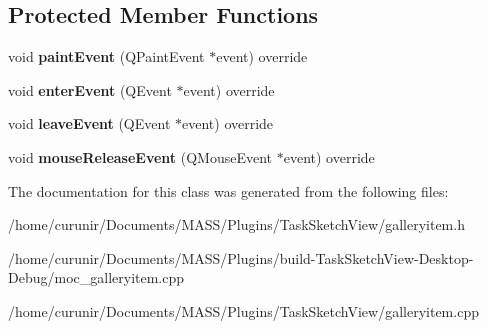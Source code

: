 \subsection*{Protected Member Functions}
\begin{DoxyCompactItemize}
\item 
void {\bfseries paint\+Event} (Q\+Paint\+Event $\ast$event) override\hypertarget{class_gallery_item_a75d0afa0d561668b65a5f158efb7e7ce}{}\label{class_gallery_item_a75d0afa0d561668b65a5f158efb7e7ce}

\item 
void {\bfseries enter\+Event} (Q\+Event $\ast$event) override\hypertarget{class_gallery_item_a54f8de85efd7cde206458ce0ac5ad3a3}{}\label{class_gallery_item_a54f8de85efd7cde206458ce0ac5ad3a3}

\item 
void {\bfseries leave\+Event} (Q\+Event $\ast$event) override\hypertarget{class_gallery_item_afff165e5f0d9dcda2ce175cd44f58885}{}\label{class_gallery_item_afff165e5f0d9dcda2ce175cd44f58885}

\item 
void {\bfseries mouse\+Release\+Event} (Q\+Mouse\+Event $\ast$event) override\hypertarget{class_gallery_item_a6565352fbaf2708e2483f12a499ef31f}{}\label{class_gallery_item_a6565352fbaf2708e2483f12a499ef31f}

\end{DoxyCompactItemize}


The documentation for this class was generated from the following files\+:\begin{DoxyCompactItemize}
\item 
/home/curunir/\+Documents/\+M\+A\+S\+S/\+Plugins/\+Task\+Sketch\+View/galleryitem.\+h\item 
/home/curunir/\+Documents/\+M\+A\+S\+S/\+Plugins/build-\/\+Task\+Sketch\+View-\/\+Desktop-\/\+Debug/moc\+\_\+galleryitem.\+cpp\item 
/home/curunir/\+Documents/\+M\+A\+S\+S/\+Plugins/\+Task\+Sketch\+View/galleryitem.\+cpp\end{DoxyCompactItemize}
